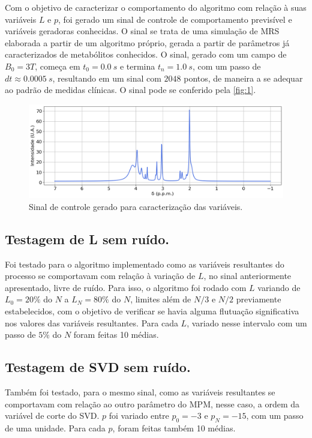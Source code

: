 \documentclass[12pt]{article}
\begin{document}
Com o objetivo de caracterizar o comportamento do algoritmo com relação à suas variáveis $L$ e $p$, foi gerado um sinal de controle 
de comportamento previsível e variáveis geradoras conhecidas. O sinal se trata de uma simulação de MRS elaborada a partir de um algoritmo 
próprio, gerada a partir de parâmetros já caracterizados de metabólitos conhecidos. O sinal, gerado com um campo de $B_0 = 3T$, começa em 
$t_0 = 0.0 \ s$ e termina $t_n = 1.0 \ s$, com um passo de $dt \approx 0.0005 \ s$, resultando em um sinal com $2048$ pontos, de maneira 
a se adequar ao padrão de medidas clínicas. O sinal pode se conferido pela \autoref{fig:1}.

\begin{figure} [H]
    \includegraphics[scale=0.5]{sinal-de-controle.png}
    \centering
    \caption{Sinal de controle gerado para caracterização das variáveis.}
    \label{fig:1}
\end{figure}
 

\subsection{Testagem de L sem ruído.}

Foi testado para o algoritmo implementado como as variáveis resultantes do processo se comportavam com relação à variação de $L$, no sinal 
anteriormente apresentado, livre de ruído. Para isso, o algoritmo foi rodado com $L$ variando de $L_0 = 20\%$ do $N$ a $L_N = 80\%$ do $N$, 
limites além de $N/3$ e $N/2$ previamente estabelecidos, com o objetivo de verificar se havia alguma flutuação significativa nos valores das 
variáveis resultantes. Para cada $L$, variado nesse intervalo com um passo de $5\%$ do $N$ foram feitas 10 médias.

\subsection{Testagem de SVD sem ruído.}

Também foi testado, para o mesmo sinal, como as variáveis resultantes se comportavam com relação ao outro parâmetro do MPM, nesse caso, a 
ordem da variável de corte do SVD. $p$ foi variado entre $p_0 = -3$ e $p_N = -15$, com um passo de uma unidade. Para cada $p$, foram feitas 
também 10 médias. 
\end{document}
